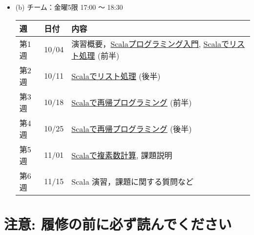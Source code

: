 \documentclass[a4j]{article}
\begin{document}
\begin{itemize}
\begin{itemize}
\item (b) チーム：金曜5限 17:00 〜 18:30\\
\label{sec-1-6-2}%
\begin{center}
\begin{tabular}{lll}
\hline
 週     &  日付   &  内容                                                                                                                                                                                                  \\
\hline
 第1週  &  10/04  &  演習概要，\href{http://bach.istc.kobe-u.ac.jp/lect/ProLang/org/scala.html}{Scalaプログラミング入門}, \href{http://bach.istc.kobe-u.ac.jp/lect/ProLang/org/scala-list.html}{Scalaでリスト処理} (前半)  \\
\hline
 第2週  &  10/11  &  \href{http://bach.istc.kobe-u.ac.jp/lect/ProLang/org/scala-list.html}{Scalaでリスト処理} (後半)                                                                                                       \\
\hline
 第3週  &  10/18  &  \href{http://bach.istc.kobe-u.ac.jp/lect/ProLang/org/scala-recursive.html}{Scalaで再帰プログラミング} (前半)                                                                                          \\
\hline
 第4週  &  10/25  &  \href{http://bach.istc.kobe-u.ac.jp/lect/ProLang/org/scala-recursive.html}{Scalaで再帰プログラミング} (後半)                                                                                          \\
\hline
 第5週  &  11/01  &  \href{http://bach.istc.kobe-u.ac.jp/lect/ProLang/org/scala-complex.html}{Scalaで複素数計算}, 課題説明                                                                                                 \\
\hline
 第6週  &  11/15  &  Scala 演習，課題に関する質問など                                                                                                                                                                      \\
\hline
\end{tabular}
\end{center}




\end{itemize} %
\end{itemize} %
\section*{注意: 履修の前に必ず読んでください}
\label{sec-2}
\end{document}
